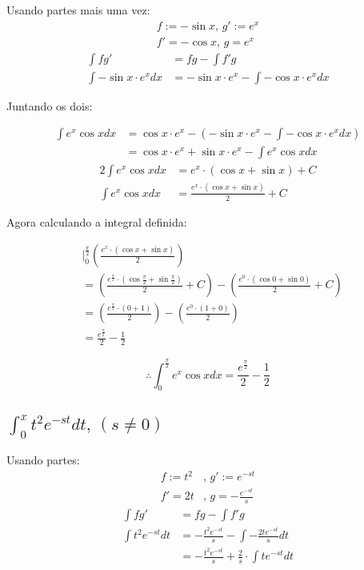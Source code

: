 \documentclass[12pt]{article}
\theoremstyle{definition}
\begin{document}
Usando partes mais uma vez:
\begin{align*}
	f := -\sin{x}\text{, } g' := e^x \\
	f' = -\cos{x}\text{, } g = e^x   
\end{align*}
\begin{align*}
	\int f g'
	  & = fg - \int f' g                                 \\
	\int{-\sin{x} \cdot e^x dx}
	  & = -\sin{x}\cdot e^x - \int{-\cos{x}\cdot e^x dx} 
\end{align*}

Juntando os dois:

\begin{align*}
	\int{e^x\cos{x}dx}
	  & = \cos{x}\cdot e^x - \left(-\sin{x}\cdot e^x-\int{-\cos{x}\cdot e^x dx}\right) \\
	  & = \cos{x}\cdot e^x + \sin{x}\cdot e^x - \int{e^x \cos{x} dx}                   
\end{align*}
\begin{align*}
	2 \int{e^x\cos{x}dx} & = e^x \cdot (\cos{x}+\sin{x}) + C           \\
	\int{e^x\cos{x}dx}   & = \frac{e^x \cdot (\cos{x}+\sin{x})}{2} + C 
\end{align*}

Agora calculando a integral definida:

\begin{align*}
	  &\bigg\rvert_0^{\frac{\pi}{2}} \left(\frac{e^x \cdot (\cos{x}+\sin{x})}{2}\right) \\
	  & = \left(\frac{e^{\frac{\pi}{2}} \cdot (\cos{\frac{\pi}{2}}+\sin{\frac{\pi}{2}})}{2} + C\right) - \left(\frac{e^{0} \cdot (\cos{0}+\sin{0})}{2} + C\right) \\ %
	  & = \left(\frac{e^{\frac{\pi}{2}} \cdot (0+1)}{2}\right) - \left(\frac{e^{0} \cdot (1+0)}{2}\right)                                                 \\
	  & = \frac{e^{\frac{\pi}{2}}}{2} - \frac{1}{2}                                                                                                       
\end{align*}

\[
	\boxed{
		\therefore \int_0^{\frac{\pi}{2}} e^x \cos{x} dx= \frac{e^{\frac{\pi}{2}}}{2} - \frac{1}{2}
	}
\]
\subsection{\(\int_0^x t^2 e^{-st} dt\text{, }(s\ne 0)\)}
Usando partes:
\begin{align*}
	f := t^2 & \text{, } g' := e^{-st}          \\
	f' = 2t  & \text{, } g = -\frac{e^{-st}}{s} 
\end{align*}
\begin{align*}
	\int f g'
	  & = fg - \int f' g                                            \\
	\int{t^2 e^{-st} dt}
	  & = -\frac{t^2e^{-st}}{s} - \int{-\frac{2te^{-st}}{s}dt}      \\
	  & = -\frac{t^2e^{-st}}{s} +\frac{2}{s} \cdot \int{te^{-st}dt} 
\end{align*}
\end{document}
